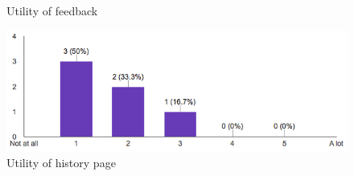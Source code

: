 \begin{figure}[!ht]
\begin{minipage}{.5\textwidth}
		\caption{Utility of feedback}
		\label{fig:int_usage_smartphone}
	\end{minipage}%
	\begin{minipage}{.5\textwidth}
		\centering
		\includegraphics[scale=0.5]{Figures/responses/utility_of_history.png}
		\caption{Utility of history page}
		\label{fig:int_usage_smartphone}
	\end{minipage}%
\end{figure}
